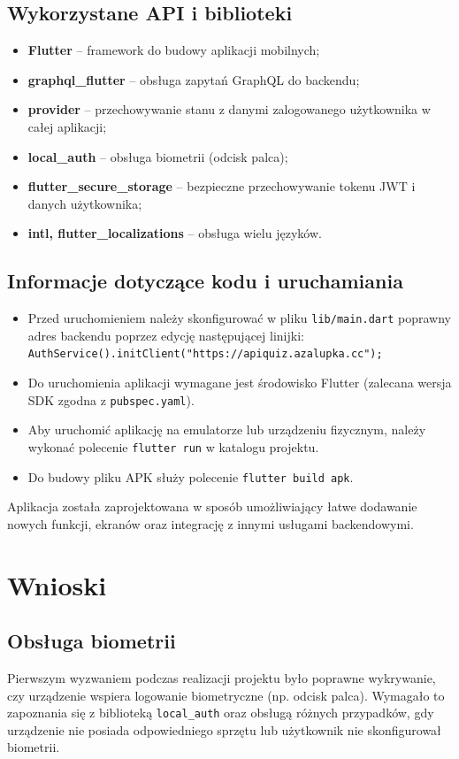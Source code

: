 \documentclass{article}
\begin{document}
	\subsection*{Wykorzystane API i biblioteki}
		\begin{itemize}
			\item \textbf{Flutter} – framework do budowy aplikacji mobilnych;
			\item \textbf{graphql\_flutter} – obsługa zapytań GraphQL do backendu;
			\item \textbf{provider} – przechowywanie stanu z danymi zalogowanego użytkownika w całej aplikacji;
			\item \textbf{local\_auth} – obsługa biometrii (odcisk palca);
			\item \textbf{flutter\_secure\_storage} – bezpieczne przechowywanie tokenu JWT i danych użytkownika;
			\item \textbf{intl, flutter\_localizations} – obsługa wielu języków.
		\end{itemize}

	\subsection*{Informacje dotyczące kodu i uruchamiania}
		\begin{itemize}
			\item Przed uruchomieniem należy skonfigurować w pliku \texttt{lib/main.dart} poprawny adres backendu poprzez edycję następującej linijki: \\
			\texttt{AuthService().initClient("https://apiquiz.azalupka.cc");}
			\item Do uruchomienia aplikacji wymagane jest środowisko Flutter (zalecana wersja SDK zgodna z \texttt{pubspec.yaml}).
			\item Aby uruchomić aplikację na emulatorze lub urządzeniu fizycznym, należy wykonać polecenie \texttt{flutter run} w katalogu projektu.
			\item Do budowy pliku APK służy polecenie \texttt{flutter build apk}.
		\end{itemize}

	Aplikacja została zaprojektowana w sposób umożliwiający łatwe dodawanie nowych funkcji, ekranów oraz integrację z innymi usługami backendowymi.

\section{Wnioski}
\subsection*{Obsługa biometrii}
	Pierwszym wyzwaniem podczas realizacji projektu było poprawne wykrywanie, czy urządzenie wspiera logowanie biometryczne (np. odcisk palca). Wymagało to zapoznania się z biblioteką \texttt{local\_auth} oraz obsługą różnych przypadków, gdy urządzenie nie posiada odpowiedniego sprzętu lub użytkownik nie skonfigurował biometrii.
	
\end{document}
